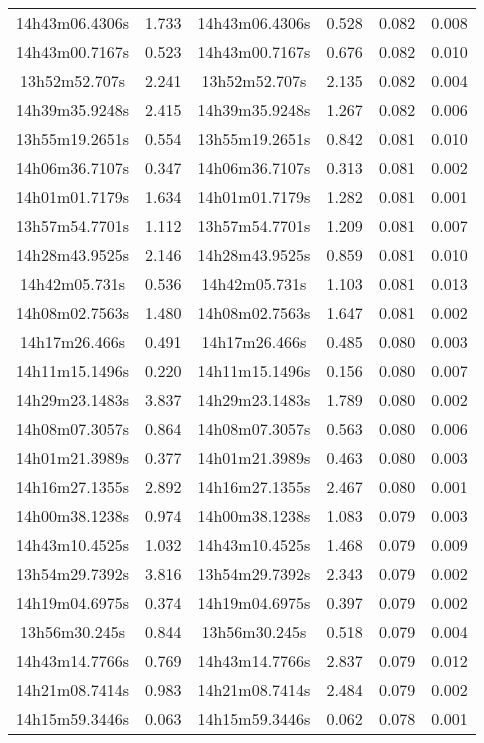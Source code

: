 \begin{table}
\begin{tabular}{cccccc}
14h43m06.4306s & 1.733 & 14h43m06.4306s & 0.528 & 0.082 & 0.008 \\
14h43m00.7167s & 0.523 & 14h43m00.7167s & 0.676 & 0.082 & 0.010 \\
13h52m52.707s & 2.241 & 13h52m52.707s & 2.135 & 0.082 & 0.004 \\
14h39m35.9248s & 2.415 & 14h39m35.9248s & 1.267 & 0.082 & 0.006 \\
13h55m19.2651s & 0.554 & 13h55m19.2651s & 0.842 & 0.081 & 0.010 \\
14h06m36.7107s & 0.347 & 14h06m36.7107s & 0.313 & 0.081 & 0.002 \\
14h01m01.7179s & 1.634 & 14h01m01.7179s & 1.282 & 0.081 & 0.001 \\
13h57m54.7701s & 1.112 & 13h57m54.7701s & 1.209 & 0.081 & 0.007 \\
14h28m43.9525s & 2.146 & 14h28m43.9525s & 0.859 & 0.081 & 0.010 \\
14h42m05.731s & 0.536 & 14h42m05.731s & 1.103 & 0.081 & 0.013 \\
14h08m02.7563s & 1.480 & 14h08m02.7563s & 1.647 & 0.081 & 0.002 \\
14h17m26.466s & 0.491 & 14h17m26.466s & 0.485 & 0.080 & 0.003 \\
14h11m15.1496s & 0.220 & 14h11m15.1496s & 0.156 & 0.080 & 0.007 \\
14h29m23.1483s & 3.837 & 14h29m23.1483s & 1.789 & 0.080 & 0.002 \\
14h08m07.3057s & 0.864 & 14h08m07.3057s & 0.563 & 0.080 & 0.006 \\
14h01m21.3989s & 0.377 & 14h01m21.3989s & 0.463 & 0.080 & 0.003 \\
14h16m27.1355s & 2.892 & 14h16m27.1355s & 2.467 & 0.080 & 0.001 \\
14h00m38.1238s & 0.974 & 14h00m38.1238s & 1.083 & 0.079 & 0.003 \\
14h43m10.4525s & 1.032 & 14h43m10.4525s & 1.468 & 0.079 & 0.009 \\
13h54m29.7392s & 3.816 & 13h54m29.7392s & 2.343 & 0.079 & 0.002 \\
14h19m04.6975s & 0.374 & 14h19m04.6975s & 0.397 & 0.079 & 0.002 \\
13h56m30.245s & 0.844 & 13h56m30.245s & 0.518 & 0.079 & 0.004 \\
14h43m14.7766s & 0.769 & 14h43m14.7766s & 2.837 & 0.079 & 0.012 \\
14h21m08.7414s & 0.983 & 14h21m08.7414s & 2.484 & 0.079 & 0.002 \\
14h15m59.3446s & 0.063 & 14h15m59.3446s & 0.062 & 0.078 & 0.001 \\

\end{tabular}
\end{table}
